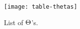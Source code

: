 \begin{figure}[p]
	\texttt{[image: table-thetas]}
	\caption{List of $\Theta$'s.}
	\label{fg:table-thetas}
\end{figure}
